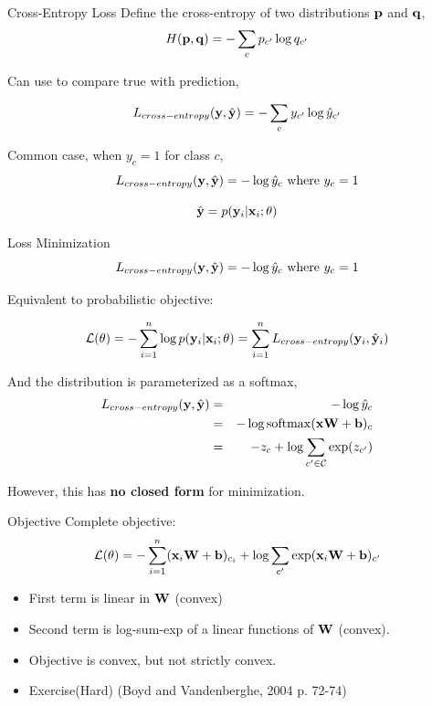 \documentclass{beamer}
\begin{document}
\begin{frame}{Cross-Entropy Loss}
  Define the cross-entropy of two distributions $\mathbf{p}$ and $\mathbf{q}$, 
  \[ H(\mathbf{p}, \mathbf{q})= -\sum_{c}p_{c'} \log q_{c'}  \]

  Can use to compare true with prediction,

  \[L_{cross-entropy}(\mathbf{y}, \hat{\mathbf{y}}) = - \sum_{c} y_{c'} \log \hat{y}_{c'} \]

  Common case, when $y_c = 1$ for class $c$,
  \[L_{cross-entropy}(\mathbf{y}, \hat{\mathbf{y}}) = - \log \hat{y}_c \mathrm{\ where\ }y_c = 1 \]

  \[ \hat{\mathbf{y}} = p(\mathbf{y}_i | \mathbf{x}_i; \theta) \]
\end{frame}

\begin{frame}{Loss Minimization}
    \[ L_{cross-entropy}(\mathbf{y}, \hat{\mathbf{y}})=  - \log \hat{y}_c \mathrm{\ where\ }y_c = 1   \]

  Equivalent to probabilistic objective:

  \[ \mathcal{L}(\theta) =  - \sum_{i=1}^n \log p(\mathbf{y}_i | \mathbf{x}_i; \theta) = \sum_{i=1}^n L_{cross-entropy}(\mathbf{y}_i, \hat{\mathbf{y}}_i) \] 


  And the distribution is parameterized as a softmax,
  \begin{eqnarray*}
    L_{cross-entropy}(\boldy, \hat{\boldy}) &=& - \log \hat{y}_c\\
    &=& -\log \softmax(\boldx \boldW + \bold b)_c \\
    &=& - z_c + \log \sum_{c' \in \mcC} \exp(z_{c'}) 
  \end{eqnarray*}

  However, this has \textbf{no closed form} for minimization.
  
\end{frame}

\begin{frame}{Objective}
  Complete objective:
  \[ \mathcal{L}(\theta) =  - \sum_{i=1}^n (\mathbf{x}_i \mathbf{W} + \mathbf{b} )_{c_i}  + \log \sum_{c'} \exp  (\mathbf{x}_i \mathbf{W}  + \mathbf{b} )_{c'} \] 
  \begin{itemize}
  \item First term is linear in $\mathbf{W}$ (convex)
  \item Second term is log-sum-exp of a linear functions of $\mathbf{W}$ (convex).
  \item Objective is convex, but not strictly convex.
  \item Exercise(Hard) (Boyd and  Vandenberghe, 2004 p. 72-74)
  \end{itemize}
\end{frame}
\end{document}
